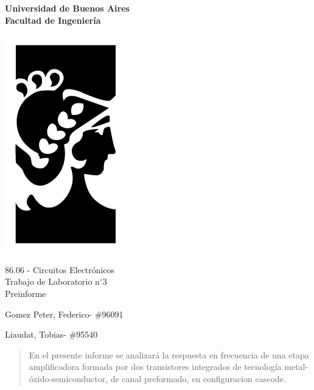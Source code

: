 \documentclass[11pt,a4paper]{article}
\newcommand{\codigoMateria}{86.06 }
\newcommand{\nombreMateria}{Circuitos Electrónicos}
\newcommand{\nroTP}{3}
\newcommand{\tipoInforme}{Preinforme}
\newcommand{\nombreDos}{Liaudat, Tobias}
\newcommand{\padronDos}{95540}
\newcommand{\nombreUno}{Gomez Peter, Federico}
\newcommand{\padronUno}{96091}
\begin{document}
\begin{center}
	\textbf{Universidad de Buenos Aires\\
	Facultad de Ingeniería}\\
	\vspace{1em}
	\begin{center}
		\includegraphics{../img/fiuba.jpg}
	\end{center}
	\LARGE{\codigoMateria - \nombreMateria\\
	Trabajo de Laboratorio n$^\circ$\nroTP\\}
	\vspace{1em}
	\large{\tipoInforme}
\end{center}

\nombreUno - \#\padronUno 

\nombreDos - \#\padronDos 

\begin{abstract}
	En el presente informe se analizará la respuesta en frecuencia de una etapa amplificadora formada por dos transistores integrados de tecnología metal-óxido-semiconductor, de canal preformado, en configuracion cascode.
\end{abstract}

\newpage









\end{document}
